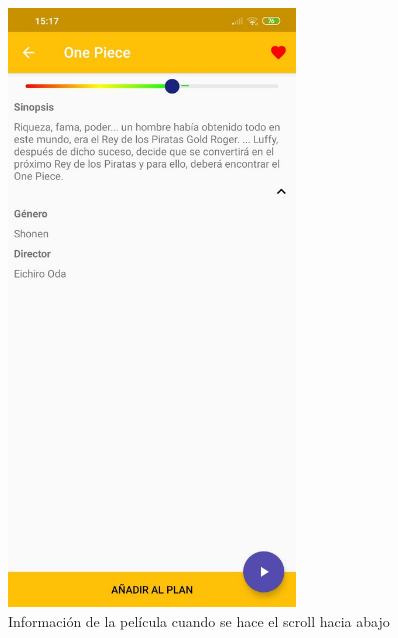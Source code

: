 \begin{figure}[H]
    \centering
    \includegraphics[width=3in]{figures/infoFilm3.jpg}
    \caption{Información de la película cuando se hace el scroll hacia abajo}
\end{figure}

